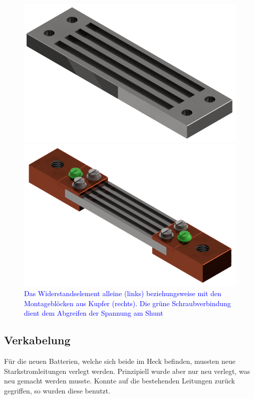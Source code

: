 {\begin{figure}[h!]
\begin{minipage}{0.49\textwidth}
\includegraphics[width=\textwidth]{images/Shunt.png}
\end{minipage}\begin{minipage}{0.49\textwidth}
\includegraphics[width=\textwidth]{images/Shunt_komplett.png}
\end{minipage}
\caption{\textcolor{blue}{Das Widerstandselement alleine (links) beziehungsweise mit den Montageblöcken aus Kupfer (rechts). Die grüne Schraubverbindung dient dem Abgreifen der Spannung am Shunt}}%
\label{fig:shunt}%
\end{figure}

\subsection{Verkabelung}
Für die neuen Batterien, welche sich beide im Heck befinden, mussten neue Starkstromleitungen verlegt werden. Prinzipiell wurde aber nur neu verlegt, was neu gemacht werden musste. Konnte auf die bestehenden Leitungen zurück gegriffen, so wurden diese benutzt.

}
